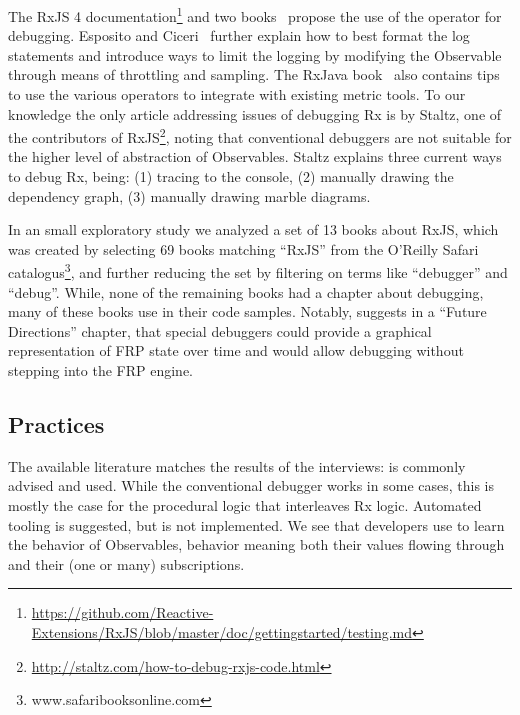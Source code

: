 The RxJS 4 documentation\footnote{
	\url{https://github.com/Reactive-Extensions/RxJS/blob/master/doc/gettingstarted/testing.md}
} and two books~\cite{esposito2016reactive,rxjavabook2016} propose the use of the  operator for debugging. Esposito and Ciceri~\cite{esposito2016reactive} further explain how to best format the log statements and introduce ways to limit the logging by modifying the Observable through means of throttling and sampling. The RxJava book~\cite{rxjavabook2016} also contains tips to use the various  operators to integrate with existing metric tools.
To our knowledge the only article addressing issues of debugging Rx is by Staltz, one of the contributors of RxJS\footnote{\url{http://staltz.com/how-to-debug-rxjs-code.html}}, noting that conventional debuggers are not suitable for the higher level of abstraction of Observables. Staltz explains three current ways to debug Rx, being: (1) tracing to the console, (2) manually drawing the dependency graph, (3) manually drawing marble diagrams.

In an small exploratory study we analyzed a set of 13 books about RxJS, which was created by selecting 69 books matching ``RxJS'' from the O'Reilly Safari catalogus\footnote{www.safaribooksonline.com}, and further reducing the set by filtering on terms like ``debugger'' and ``debug''. While, none of the remaining books had a chapter about debugging, many of these books use \printfdebugging{} in their code samples. Notably, \cite{frpbook2016} suggests in a ``Future Directions'' chapter, that special debuggers could provide a graphical representation of FRP state over time and would allow debugging without stepping into the FRP engine.



\subsection{Practices}
The available literature matches the results of the interviews: \printfdebugging{} is commonly advised and used. While the conventional debugger works in some cases, this is mostly the case for the procedural logic that interleaves Rx logic. Automated tooling is suggested, but is not implemented. We see that developers use \printfdebugging{} to learn the behavior of Observables, behavior meaning both their values flowing through and their (one or many) subscriptions. 

